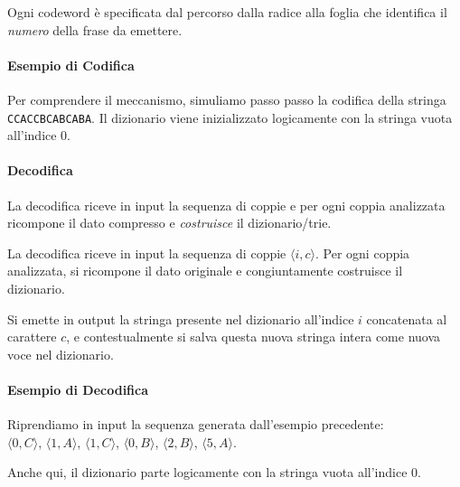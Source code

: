 

Ogni codeword è specificata dal percorso dalla radice alla foglia che identifica il \textit{numero} della frase da emettere.

\paragraph{Esempio di Codifica}
Per comprendere il meccanismo, simuliamo passo passo la codifica della stringa \texttt{CCACCBCABCABA}. Il dizionario viene inizializzato logicamente con la stringa vuota all'indice 0.


\paragraph{Decodifica}
La decodifica riceve in input la sequenza di coppie e per ogni coppia analizzata ricompone il dato compresso e \textit{costruisce} il dizionario/trie.

La decodifica riceve in input la sequenza di coppie $\langle i, c \rangle$. Per ogni coppia analizzata, si ricompone il dato originale e congiuntamente costruisce il dizionario.

Si emette in output la stringa presente nel dizionario all'indice $i$ concatenata al carattere $c$, e contestualmente si salva questa nuova stringa intera come nuova voce nel dizionario.

\paragraph{Esempio di Decodifica}
Riprendiamo in input la sequenza generata dall'esempio precedente:\\
$\langle 0, C \rangle$, $\langle 1, A \rangle$, $\langle 1, C \rangle$, $\langle 0, B \rangle$, $\langle 2, B \rangle$, $\langle 5, A \rangle$.

Anche qui, il dizionario parte logicamente con la stringa vuota all'indice 0.



